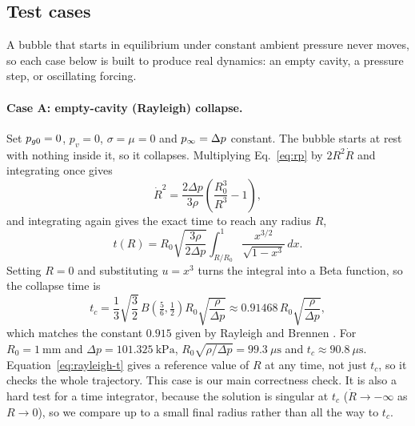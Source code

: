 \subsection{Test cases}\label{sec:cases}

A bubble that starts in equilibrium under constant ambient pressure never moves, so each
case below is built to produce real dynamics: an empty cavity, a pressure step, or
oscillating forcing.

\paragraph{Case A: empty-cavity (Rayleigh) collapse.} Set $p_{g0} = 0$, $p_v = 0$,
$\sigma = \mu = 0$ and $p_\infty = \Delta p$ constant. The bubble starts at rest with nothing
inside it, so it collapses. Multiplying Eq.~\eqref{eq:rp} by $2R^2\dot R$ and integrating
once gives
\begin{equation}\label{eq:rayleigh-energy}
  \dot R^2 = \frac{2\Delta p}{3\rho}\left(\frac{R_0^3}{R^3} - 1\right),
\end{equation}
and integrating again gives the exact time to reach any radius $R$,
\begin{equation}\label{eq:rayleigh-t}
  t(R) = R_0\sqrt{\frac{3\rho}{2\Delta p}}\int_{R/R_0}^{1}\frac{x^{3/2}}{\sqrt{1 - x^3}}\,dx .
\end{equation}
Setting $R = 0$ and substituting $u = x^3$ turns the integral into a Beta function, so the
collapse time is
\begin{equation}\label{eq:tc}
  t_c = \frac{1}{3}\sqrt{\frac{3}{2}}\,B\!\left(\tfrac{5}{6},\tfrac{1}{2}\right) R_0\sqrt{\frac{\rho}{\Delta p}}
      \approx 0.91468\,R_0\sqrt{\frac{\rho}{\Delta p}},
\end{equation}
which matches the constant $0.915$ given by Rayleigh \cite{rayleigh1917} and Brennen
\cite{brennen1995}. For $R_0 = 1\ \mathrm{mm}$ and $\Delta p = 101.325\ \mathrm{kPa}$,
$R_0\sqrt{\rho/\Delta p} = 99.3\ \mu\mathrm{s}$ and $t_c \approx 90.8\ \mu\mathrm{s}$.
Equation~\eqref{eq:rayleigh-t} gives a reference value of $R$ at any time, not just $t_c$, so
it checks the whole trajectory. This case is our main correctness check. It is also a hard
test for a time integrator, because the solution is singular at $t_c$
($\dot R \to -\infty$ as $R \to 0$), so we compare up to a small final radius rather than all
the way to $t_c$.

